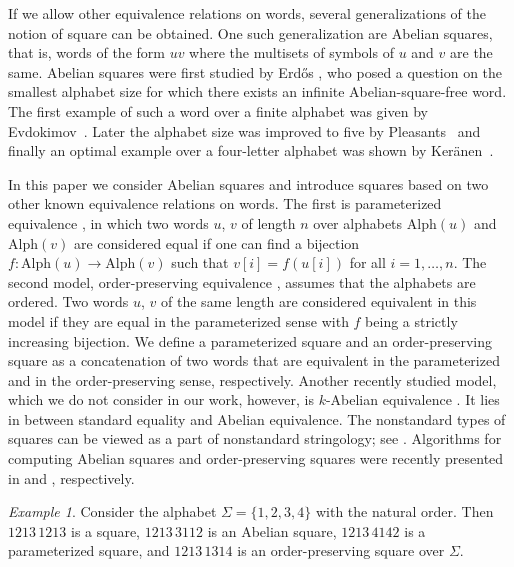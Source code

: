 \documentclass{article}
\theoremstyle{plain}
\theoremstyle{definition}
\theoremstyle{remark}
\newtheorem{example}[theorem]{Example}
\renewcommand{\Alph}{\mathrm{Alph}}
\begin{document}
  If we allow other equivalence relations on words, several generalizations of the notion of square
  can be obtained.
  One such generalization are Abelian squares, that is, words of the form $uv$ where
  the multisets of symbols of $u$ and $v$ are the same.
  Abelian squares were first studied by Erd\H{o}s \cite{Erdos}, who posed a question on
  the smallest alphabet size for which there exists an infinite Abelian-square-free word.
  The first example of such a word over a finite alphabet was given by Evdokimov~\cite{evdokimov}.
  Later the alphabet size was improved to five by Pleasants~\cite{Pleasants}
  and finally an optimal example over a four-letter alphabet was shown by
  Ker\"anen~\cite{DBLP:conf/icalp/Keranen92}.

  In this paper we consider Abelian squares and introduce squares based
  on two other known equivalence relations on words.
  The first is parameterized equivalence \cite{DBLP:journals/jcss/Baker96}, in which two words
  $u$, $v$ of length $n$ over alphabets $\Alph(u)$ and $\Alph(v)$ are considered equal
  if one can find a bijection $f : \Alph(u) \to \Alph(v)$
  such that $v[i]=f(u[i])$ for all $i=1,\ldots,n$.
  The second model, order-preserving equivalence \cite{DBLP:journals/ipl/KubicaKRRW13,DBLP:journals/tcs/KimEFHIPPT14},
  assumes that the alphabets are ordered.
  Two words $u$, $v$ of the same length are considered equivalent in this model if they are
  equal in the parameterized sense with $f$ being a strictly increasing bijection.
  We define a parameterized square and an order-preserving square as a concatenation
  of two words that are equivalent in the parameterized and in the order-preserving sense, respectively.
  Another recently studied model, which we do not consider in our work, however,
  is $k$-Abelian equivalence \cite{DBLP:journals/tcs/HuovaKS12}.
  It lies in between standard equality and Abelian equivalence.
  The nonstandard types of squares can be viewed as a part of nonstandard stringology;
  see \cite{DBLP:conf/cpm/Muthukrishnan95,Muthukrishnan:1994:NSA:195058.195457}.
  Algorithms for computing Abelian squares and order-preserving squares were recently presented
  in \cite{MACIS2015} and \cite{Crochemore2015}, respectively.

  \begin{example}
    Consider the alphabet $\Sigma=\{1,2,3,4\}$ with the natural order.
    Then $1213\,1213$ is a square,
    $1213\,3112$ is an Abelian square,
    $1213\,4142$ is a parameterized square,
    and $1213\,1314$ is an order-preserving square over $\Sigma$.
  \end{example}
\end{document}
